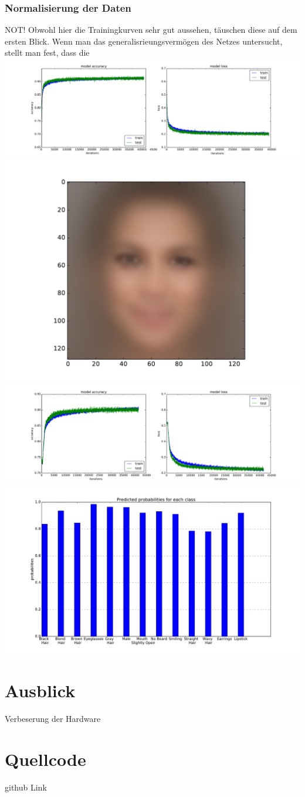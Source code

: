 \documentclass[12.5pt]{scrartcl}
\begin{document}
	\subsubsection{Normalisierung der Daten}
	NOT! Obwohl hier die Trainingkurven sehr gut aussehen, täuschen diese auf dem ersten Blick. Wenn man das generalisrieungsvermögen des Netzes untersucht, stellt man fest, dass die \\
	\includegraphics[width=\linewidth]{images/lossBad}\\
	\includegraphics[width=0.88\linewidth]{images/meanFace}\\
	\includegraphics[width=\linewidth]{images/lossGood}\\
	\includegraphics[width=0.88\linewidth]{images/accuracy_on_classes}
	\section{Ausblick}
	Verbeserung der Hardware
	\section{Quellcode}
	github Link
	
\end{document}
